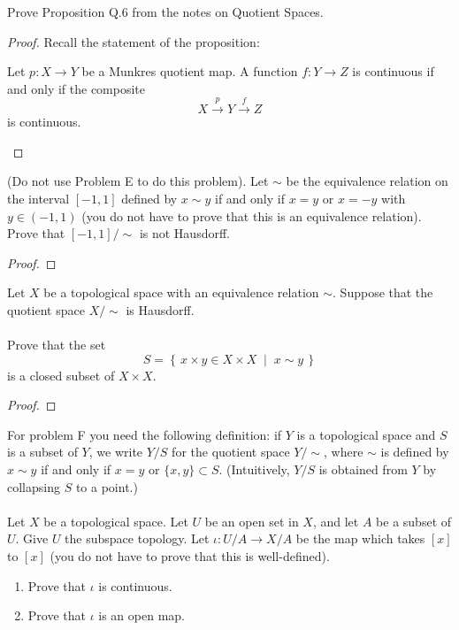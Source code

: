 \newpage
\begin{problem}[C]
Prove Proposition Q.6 from the notes on Quotient Spaces.
\end{problem}
\begin{proof}
Recall the statement of the proposition:
\begin{proposition*}[Proposition Q.6]
Let $p\colon X\to Y$ be a Munkres quotient map. A function
$f\colon Y\to Z$ is continuous if and only if the composite
\[
X\overset{p}{\longrightarrow}Y\overset{f}{\longrightarrow}Z
\]
is continuous.
\end{proposition*}
\end{proof}
\newpage
\begin{problem}[D]
(Do not use Problem E to do this problem). Let $\sim$ be the
equivalence relation on the interval $[-1,1]$ defined by $x\sim
y$ if and only if $x=y$ or $x=-y$ with $y\in(-1,1)$ (you do not
have to prove that this is an equivalence relation). Prove that
$[-1,1]/{\sim}$ is not Hausdorff.
\end{problem}
\begin{proof}
\end{proof}
\newpage
\begin{problem}[E]
Let $X$ be a topological space with an equivalence relation
$\sim$. Suppose that the quotient space $X/\sim$ is Hausdorff.
\\\\
Prove that the set
\[
S=\left\{\,x\times y\in X\times X\;\middle|\;x\sim y\,\right\}
\]
is a closed subset of $X\times X$.
\end{problem}
\begin{proof}
\end{proof}
\newpage
\begin{problem}[F]
For problem F you need the following definition: if $Y$ is a
topological space and $S$ is a subset of $Y$, we write $Y/S$ for
the quotient space $Y/{\sim}$, where $\sim$ is defined by $x\sim y$
if and only if $x=y$ or $\{x,y\}\subset S$. (Intuitively, $Y/S$
is obtained from $Y$ by collapsing $S$ to a point.)
\\\\
Let $X$ be a topological space. Let $U$ be an open set in $X$,
and let $A$ be a subset of $U$. Give $U$ the subspace
topology. Let $\iota\colon U/A\to X/A$ be the map which takes
$[x]$ to $[x]$ (you do not have to prove that this is
well-defined).
\begin{enumerate}[noitemsep,label=(\roman*)]
\item Prove that $\iota$ is continuous.
\item Prove that $\iota$ is an open map.
\end{enumerate}
\end{problem}
